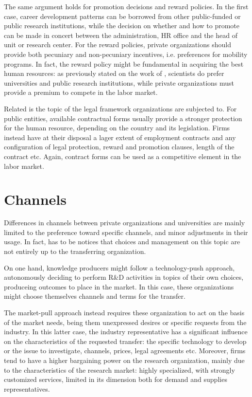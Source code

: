 The same argument holds for promotion decisions and reward policies. In the first case, career development patterns can be borrowed from other public-funded or public research institutions, while the decision on whether and how to promote can be made in concert between the administration, HR office and the head of unit or research center. For the reward policies, private organizations should provide both pecuniary and non-pecuniary incentives, i.e. preferences for mobility programs. In fact, the reward policy might be fundamental in acquiring the best human resources: as previously stated on the work of \citet{Stern2004}, scientists do prefer universities and public research institutions, while private organizations must provide a premium to compete in the labor market.

Related is the topic of the legal framework organizations are subjected to. For public entities, available contractual forms usually provide a stronger protection for the human resource, depending on the country and its legislation. Firms instead have at their disposal a lager extent of employment contracts and any configuration of legal protection, reward and promotion clauses, length of the contract etc. Again, contract forms can be used as a competitive element in the labor market. 

\section{Channels}

Differences in channels between private organizations and universities are mainly limited to the preference toward specific channels, and minor adjustments in their usage. In fact, has to be notices that choices and management on this topic are not entirely up to the transferring organization. 

On one hand, knowledge producers might follow a technology-push approach, autonomously deciding to perform R\&D activities in topics of their own choices, produceing outcomes to place in the market. In this case, these organizations might choose themselves channels and terms for the transfer.

The market-pull approach instead requires these organization to act on the basis of the market needs, being them unexpressed desires or specific requests from the industry. In this latter case, the industry representative has a significant influence on the characteristics of the requested transfer: the specific technology to develop or the issue to investigate, channels, prices, legal agreements etc. Moreover, firms tend to have a higher bargaining power on the research organization, mainly due to the characteristics of the research market: highly specialized, with strongly customized services, limited in its dimension both for demand and supplies representatives.

